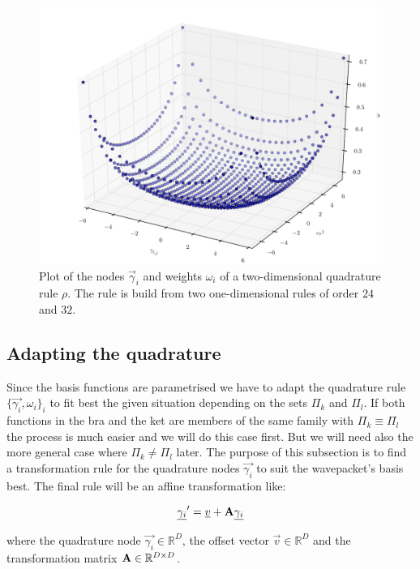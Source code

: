 \begin{figure}
  \centering
  \includegraphics[width=0.8\linewidth]{./fig/tensor_qr.pdf}
  \caption[A two-dimensional quadrature rule]{
    Plot of the nodes $\vec{\gamma}_i$ and weights $\omega_i$ of
    a two-dimensional quadrature rule $\rho$. The rule is build
    from two one-dimensional rules of order $24$ and $32$.
  }
  \label{fig:tensor_product_qr}
\end{figure}


\subsection{Adapting the quadrature}


Since the basis functions are parametrised we have to adapt the quadrature rule
$\{\vec{\gamma_i}, \omega_i\}_i$ to fit best the given situation depending on the
sets $\Pi_k$ and $\Pi_l$. If both functions in the bra and the ket are members of
the same family with $\Pi_k \equiv \Pi_l$ the process is much easier and we will
do this case first. But we will need also the more general case where $\Pi_k \neq \Pi_l$
later. The purpose of this subsection is to find a transformation rule for the quadrature
nodes $\vec{\gamma_i}$ to suit the wavepacket's basis best. The final rule will
be an affine transformation like:

\begin{equation} \label{eq:transformed_qr_nodes}
  \underline{\gamma_i}^\prime = \underline{v} + \mathbf{A} \underline{\gamma_i}
\end{equation}

where the quadrature node $\vec{\gamma_i} \in \mathbb{R}^D$, the offset vector
$\vec{v} \in \mathbb{R}^D$ and the transformation matrix $\mathbf{A} \in \mathbb{R}^{D \times D}$.


